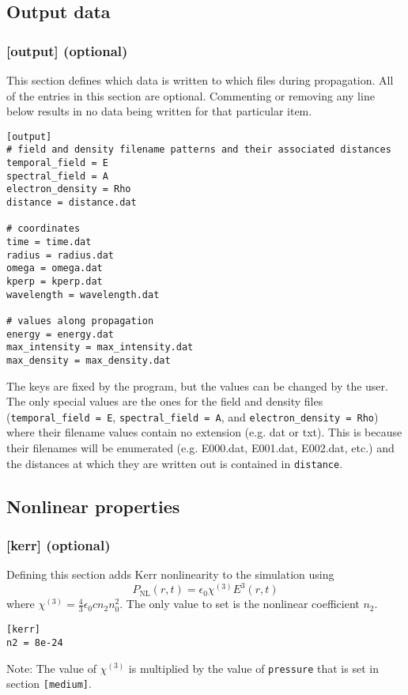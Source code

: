 \documentclass{article}
\begin{document}
\subsection{Output data}
\subsubsection{[output] (optional)}
This section defines which data is written to which files during
propagation.  All of the entries in this section are
optional. Commenting or removing any line below results in no data
being written for that particular item.
\begin{lstlisting}
[output]
# field and density filename patterns and their associated distances
temporal_field = E
spectral_field = A
electron_density = Rho
distance = distance.dat

# coordinates
time = time.dat
radius = radius.dat
omega = omega.dat
kperp = kperp.dat
wavelength = wavelength.dat

# values along propagation
energy = energy.dat
max_intensity = max_intensity.dat
max_density = max_density.dat
\end{lstlisting}

The keys are fixed by the program, but the values can be changed by
the user.  The only special values are the ones for the field and
density files (\texttt{temporal\_field = E}, \texttt{spectral\_field =
  A}, and \texttt{electron\_density = Rho}) where their filename values
contain no extension (e.g. dat or txt). This is because their
filenames will be enumerated (e.g. E000.dat, E001.dat, E002.dat, etc.)
and the distances at which they are written out is contained in
\texttt{distance}.

\subsection{Nonlinear properties}
\subsubsection{[kerr] (optional)}
Defining this section adds Kerr nonlinearity to the simulation using
\[P_{\mathrm{NL}}(r, t) = \epsilon_0 \chi^{(3)} E^3(r,t)\] where
$\chi^{(3)} = \frac43 \epsilon_0 c n_2 n_0^2$. The only value to set is the
nonlinear coefficient $n_2$.
\begin{lstlisting}
[kerr]
n2 = 8e-24
\end{lstlisting}
Note: The value of $\chi^{(3)}$ is multiplied by the value of
\texttt{pressure} that is set in section \texttt{[medium]}.
\end{document}
